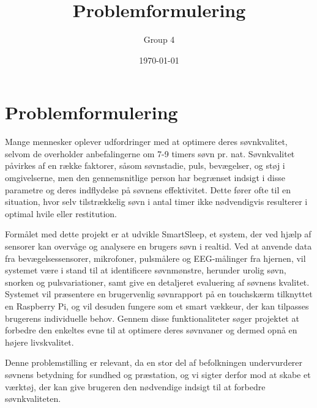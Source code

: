 \documentclass{article}
\title{Problemformulering}
\author{Group 4}
\date{\today}
\begin{document}
\maketitle

\section{Problemformulering}
Mange mennesker oplever udfordringer med at optimere deres søvnkvalitet, selvom de overholder anbefalingerne om 7-9 timers søvn pr. nat. Søvnkvalitet påvirkes af en række faktorer, såsom søvnstadie, puls, bevægelser, og støj i omgivelserne, men den gennemsnitlige person har begrænset indsigt i disse parametre og deres indflydelse på søvnens effektivitet. Dette fører ofte til en situation, hvor selv tilstrækkelig søvn i antal timer ikke nødvendigvis resulterer i optimal hvile eller restitution.

Formålet med dette projekt er at udvikle SmartSleep, et system, der ved hjælp af sensorer kan overvåge og analysere en brugers søvn i realtid. Ved at anvende data fra bevægelsessensorer, mikrofoner, pulsmålere og EEG-målinger fra hjernen, vil systemet være i stand til at identificere søvnmønstre, herunder urolig søvn, snorken og pulsvariationer, samt give en detaljeret evaluering af søvnens kvalitet. Systemet vil præsentere en brugervenlig søvnrapport på en touchskærm tilknyttet en Raspberry Pi, og vil desuden fungere som et smart vækkeur, der kan tilpasses brugerens individuelle behov. Gennem disse funktionaliteter søger projektet at forbedre den enkeltes evne til at optimere deres søvnvaner og dermed opnå en højere livskvalitet.

Denne problemstilling er relevant, da en stor del af befolkningen undervurderer søvnens betydning for sundhed og præstation, og vi sigter derfor mod at skabe et værktøj, der kan give brugeren den nødvendige indsigt til at forbedre søvnkvaliteten.
\end{document}

